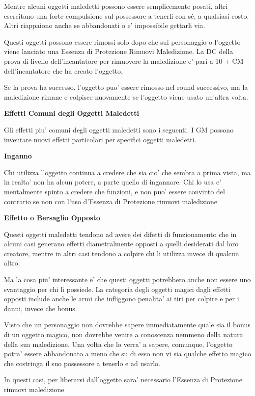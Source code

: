 \documentclass[a4paper,11pt,twoside,openany]{dndbook}
\begin{document}
{Mentre alcuni oggetti maledetti possono essere semplicemente posati, altri esercitano una forte compulsione sul possessore a tenerli con sé, a qualsiasi costo. Altri riappaiono anche se abbandonati o e' impossibile gettarli via.

Questi oggetti possono essere rimossi solo dopo che sul personaggio o l'oggetto viene lanciato una Essenza di Protezione Rimuovi Maledizione. La DC della prova di livello dell'incantatore per rimuovere la maledizione e' pari a 10 + CM dell'incantatore che ha creato l'oggetto.

Se la prova ha successo, l'oggetto puo' essere rimosso nel round successivo, ma la maledizione rimane e colpisce nuovamente se l'oggetto viene usato un'altra volta.

\textbf{Effetti Comuni degli Oggetti Maledetti}

Gli effetti piu' comuni degli oggetti maledetti sono i seguenti. I GM possono inventare nuovi effetti particolari per specifici oggetti maledetti.

\textbf{Inganno}

Chi utilizza l'oggetto continua a credere che sia cio' che sembra a prima vista, ma in realta' non ha alcun potere, a parte quello di ingannare. Chi lo usa e' mentalmente spinto a credere che funzioni, e non puo' essere convinto del contrario se non con l'uso d'Essenza di Protezione rimuovi maledizione

\textbf{Effetto o Bersaglio Opposto}

Questi oggetti maledetti tendono ad avere dei difetti di funzionamento che in alcuni casi generano effetti diametralmente opposti a quelli desiderati dal loro creatore, mentre in altri casi tendono a colpire chi li utilizza invece di qualcun altro.

Ma la cosa piu' interessante e' che questi oggetti potrebbero anche non essere uno svantaggio per chi li possiede. La categoria degli oggetti magici dagli effetti opposti include anche le armi che infliggono penalita' ai tiri per colpire e per i danni, invece che bonus.

Visto che un personaggio non dovrebbe sapere immediatamente quale sia il bonus di un oggetto magico, non dovrebbe venire a conoscenza nemmeno della natura della sua maledizione. Una volta che lo verra' a sapere, comunque, l'oggetto potra' essere abbandonato a meno che su di esso non vi sia qualche effetto magico che costringa il suo possessore a tenerlo e ad usarlo.

In questi casi, per liberarsi dall'oggetto sara' necessario l'Essenza di Protezione rimuovi maledizione

}
\end{document}
